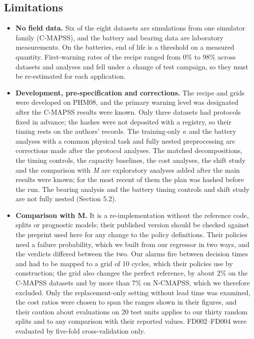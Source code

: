 \documentclass[a4paper,fleqn,doubleblind]{cas-dc}
\begin{document}
\subsection{Limitations}

\begin{itemize}[leftmargin=1.2em,itemsep=2pt]
\item \textbf{No field data.} Six of the eight datasets are simulations from one simulator family (C-MAPSS), and the battery and bearing data are laboratory measurements. On the batteries, end of life is a threshold on a measured quantity. First-warning rates of the recipe ranged from 0\% to 98\% across datasets and analyses and fell under a change of test campaign, so they must be re-estimated for each application.
\item \textbf{Development, pre-specification and corrections.} The recipe and grids were developed on PHM08, and the primary warning level was designated after the C-MAPSS results were known. Only three datasets had protocols fixed in advance; the hashes were not deposited with a registry, so their timing rests on the authors' records. The training-only $\kappa$ and the battery analyses with a common physical task and fully nested preprocessing are corrections made after the protocol analyses. The matched decompositions, the timing controls, the capacity baselines, the cost analyses, the shift study and the comparison with \textit{M} are exploratory analyses added after the main results were known; for the most recent of them the plan was hashed before the run. The bearing analysis and the battery timing controls and shift study are not fully nested (Section 5.2).
\item \textbf{Comparison with M.} It is a re-implementation without the reference code, splits or prognostic models; their published version should be checked against the preprint used here for any change to the policy definitions. Their policies need a failure probability, which we built from our regressor in two ways, and the verdicts differed between the two. Our alarms fire between decision times and had to be mapped to a grid of 10 cycles, which their policies use by construction; the grid also changes the perfect reference, by about 2\% on the C-MAPSS datasets and by more than 7\% on N-CMAPSS, which we therefore excluded. Only the replacement-only setting without lead time was examined, the cost ratios were chosen to span the ranges shown in their figures, and their caution about evaluations on 20 test units applies to our thirty random splits and to any comparison with their reported values. FD002--FD004 were evaluated by five-fold cross-validation only.

\end{itemize}
\end{document}
